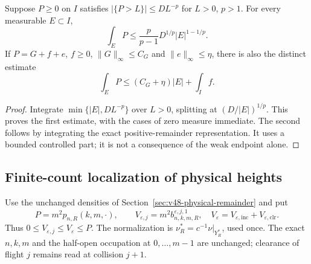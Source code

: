 \begin{lemma}
\label{lem:v56-source-weight}
Suppose $P\ge0$ on $I$ satisfies
$|\{P>L\}|\le D L^{-p}$ for $L>0$, $p>1$. For every measurable
$E\subset I$,
\begin{equation}\label{eq:v56-source-weight}
 \int_E P\le\frac{p}{p-1}D^{1/p}|E|^{1-1/p}.
\end{equation}
If $P=G+f+e$, $f\ge0$, $\|G\|_\infty\le C_G$ and
$\|e\|_\infty\le\eta$, there is also the distinct estimate
\begin{equation}\label{eq:v56-source-weight-sharp}
 \int_E P\le(C_G+\eta)|E|+\int_I f.
\end{equation}
\end{lemma}
\begin{proof}
Integrate $\min\{|E|,DL^{-p}\}$ over $L>0$, splitting at
$(D/|E|)^{1/p}$. This proves the first estimate, with the cases of
zero measure immediate. The second follows by integrating the exact
positive-remainder representation. It uses a bounded controlled
part; it is not a consequence of the weak endpoint alone.
\end{proof}

\subsection{Finite-count localization of physical heights}
Use the unchanged densities of Section~\ref{sec:v48-physical-remainder}
and put
\[
 P=m^2p_{n,R}(k,m,\cdot),\qquad
 V_{\varepsilon,j}=m^2b^{\varepsilon,j,1}_{n,k,m,R},\quad
 V_\varepsilon=V_{\varepsilon,\mathrm{inc}}+
                            V_{\varepsilon,\mathrm{clr}}.
\]
Thus $0\le V_{\varepsilon,j}\le V_\varepsilon\le P$.
The normalization is $\nu_R^*=c^{-1}\nu|_{Y_R^*}$, used once.
The exact $n,k,m$ and the half-open occupation at $0,\ldots,m-1$
are unchanged; clearance of flight $j$ remains read at collision $j+1$.

